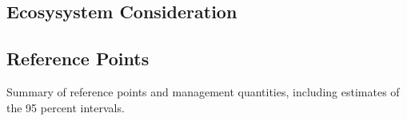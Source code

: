 \documentclass[
]{scrartcl}
\begin{document}
\subsection*{Ecosysystem Consideration}\label{ecosysystem-consideration}

\subsection*{Reference Points}\label{reference-points}

\begin{table}

\caption{\label{tbl-ref-points}Summary of reference points and
management quantities, including estimates of the 95 percent intervals.}

\centering{

}
\end{table}
\end{document}
